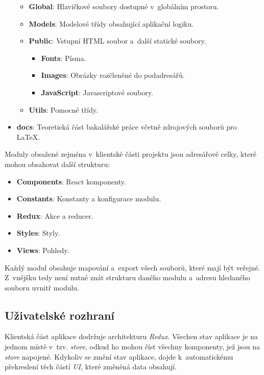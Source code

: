 \documentclass[a4paper,12pt]{article}
\begin{document}
\begin{itemize}
\begin{itemize}
\item \textbf{Global}: Hlavičkové soubory dostupné v~globálním prostoru.
\item \textbf{Models}: Modelové třídy obsahující aplikační logiku.
\item \textbf{Public}: Vstupní HTML soubor a~další statické soubory.

\begin{itemize}
\item \textbf{Fonts}: Písma.
\item \textbf{Images}: Obrázky rozčleněné do podadresářů.
\item \textbf{JavaScript}: Javascriptové soubory.
\end{itemize} 

\item \textbf{Utils}:  Pomocné třídy.
\end{itemize} 

\item \textbf{docs}:  Teoretická část bakalářské práce včetně zdrojových souborů pro LaTeX.

\end{itemize} 

Moduly obsažené zejména v~klientské části projektu jsou adresářové celky, které mohou obsahovat další strukturu:

\begin{itemize}
\item \textbf{Components}: React komponenty.
\item \textbf{Constants}: Konstanty a konfigurace modulu.
\item \textbf{Redux}: Akce a reducer.
\item \textbf{Styles}: Styly.
\item \textbf{Views}: Pohledy.
\end{itemize} 

Každý modul obsahuje mapování a~export všech souborů, které mají být veřejné. Z~vnějšku tedy není nutné znát strukturu daného modulu a~adresu hledaného souboru uvnitř modulu.





\subsection{Uživatelské rozhraní}

Klientská část aplikace dodržuje architekturu \textit{Redux}. Všechen stav aplikace je na jednom místě v~tzv. \textit{store}, odkud ho mohou číst všechny komponenty, jež jsou na \textit{store} napojené. Kdykoliv se změní stav aplikace, dojde k~automatickému překreslení těch částí \textit{UI}, které změněná data obsahují.
\end{document}
